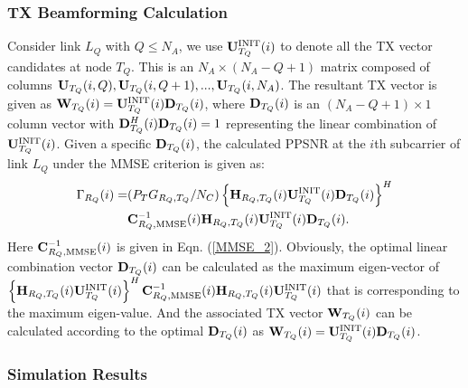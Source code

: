 \documentclass[journal, final]{IEEEtran}
\begin{document}
\subsubsection{TX Beamforming Calculation}

Consider link $L_Q $ with $Q \le N_A $, we use ${\rm {\bf U}}_{T_Q
}^{{\rm INIT}} (i)$ to denote all the TX vector candidates at node $T_Q $.
This is an $N_A \times (N_A - Q + 1)$ matrix composed of columns ${\rm {\bf
U}}_{T_Q } (i,Q),{\rm {\bf U}}_{T_Q } (i,Q + 1),...,{\rm {\bf U}}_{T_Q }
(i,N_A )$. The resultant TX vector is given as ${\rm {\bf W}}_{T_Q } (i) =
{\rm {\bf U}}_{T_Q }^{{\rm INIT}} (i){\rm {\bf D}}_{T_Q } (i)$, where ${\rm
{\bf D}}_{T_Q } (i)$ is an $(N_A - Q + 1)\times 1$ column vector with ${\rm
{\bf D}}_{T_Q }^H (i){\rm {\bf D}}_{T_Q } (i) = 1$ representing the linear
combination of ${\rm {\bf U}}_{T_Q }^{{\rm INIT}} (i)$. Given a specific
${\rm {\bf D}}_{T_Q } (i)$, the calculated PPSNR at the $i$th subcarrier of
link $L_Q $ under the MMSE criterion is given as:
\begin{align}
\label{eq18}
\Gamma _{R_Q } (i) =& (P_T G_{R_Q ,T_Q } /N_C)\left\{ {{\rm {\bf
H}}_{R_Q ,T_Q } (i){\rm {\bf U}}_{T_Q }^{{\rm INIT}} (i){\rm {\bf D}}_{T_Q
} (i)} \right\}^H \notag\\
&{\rm {\bf C}}_{R_Q ,{\rm MMSE}}^{ - 1} (i){\rm {\bf H}}_{R_Q ,T_Q
} (i){\rm {\bf U}}_{T_Q }^{{\rm INIT}} (i){\rm {\bf D}}_{T_Q } (i).
\end{align}
Here ${\rm {\bf C}}_{R_Q,{\rm MMSE}}^{ - 1} (i)$ is given in Eqn. (\ref{MMSE_2}). Obviously,
the optimal linear combination vector ${\rm {\bf D}}_{T_Q } (i)$ can be
calculated as the maximum eigen-vector of $\left\{ {{\rm {\bf H}}_{R_Q ,T_Q
} (i){\rm {\bf U}}_{T_Q }^{{\rm INIT}} (i)} \right\}^H{\rm {\bf C}}_{R_Q
,{\rm MMSE}}^{ - 1} (i){\rm {\bf H}}_{R_Q ,T_Q } (i){\rm {\bf U}}_{T_Q
}^{{\rm INIT}} (i)$ that is corresponding to the maximum eigen-value. And
the associated TX vector ${\rm {\bf W}}_{T_Q } (i)$ can be calculated
according to the optimal ${\rm {\bf D}}_{T_Q } (i)$ as ${\rm {\bf W}}_{T_Q } (i) =
{\rm {\bf U}}_{T_Q }^{{\rm INIT}} (i){\rm {\bf D}}_{T_Q } (i)$.

\subsubsection{Simulation Results}
\end{document}
